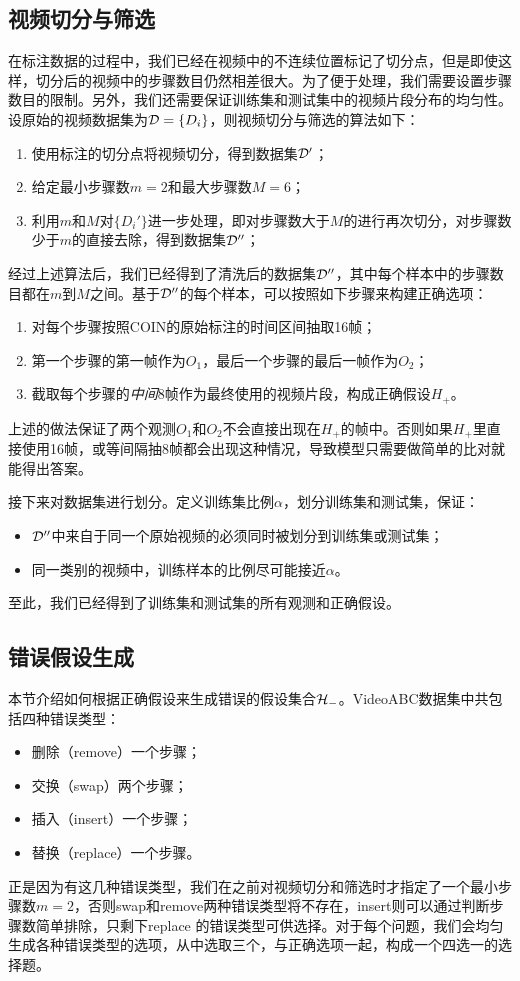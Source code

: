 \subsection{视频切分与筛选}
\label{sec:filter}
在标注数据的过程中，我们已经在视频中的不连续位置标记了切分点，但是即使这样，切分后的视频中的步骤数目仍然相差很大。为了便于处理，我们需要设置步骤数目的限制。另外，我们还需要保证训练集和测试集中的视频片段分布的均匀性。设原始的视频数据集为${\mathcal{D}}=\{D_i\}$，则视频切分与筛选的算法如下：
\begin{enumerate}
    \item 使用标注的切分点将视频切分，得到数据集${\mathcal{D}}'$；
    \item 给定最小步骤数$m=2$和最大步骤数$M=6$；
    \item 利用$m$和$M$对$\{D_i'\}$进一步处理，即对步骤数大于$M$的进行再次切分，对步骤数少于$m$的直接去除，得到数据集${\mathcal{D}}''$；

\end{enumerate}
经过上述算法后，我们已经得到了清洗后的数据集${\mathcal{D}}''$，其中每个样本中的步骤数目都在$m$到$M$之间。基于${\mathcal{D}}''$的每个样本，可以按照如下步骤来构建正确选项：
\begin{enumerate}
    \item 对每个步骤按照COIN的原始标注的时间区间抽取16帧；
    \item 第一个步骤的第一帧作为$O_1$，最后一个步骤的最后一帧作为$O_2$；
    \item 截取每个步骤的\emph{中间}8帧作为最终使用的视频片段，构成正确假设$H_+$。
\end{enumerate}

上述的做法保证了两个观测$O_1$和$O_2$不会直接出现在$H_+$的帧中。否则如果$H_+$里直接使用16帧，或等间隔抽8帧都会出现这种情况，导致模型只需要做简单的比对就能得出答案。

接下来对数据集进行划分。定义训练集比例$\alpha$，划分训练集和测试集，保证：
\begin{itemize}
    \item ${\mathcal{D}}''$中来自于同一个原始视频的必须同时被划分到训练集或测试集；
    \item 同一类别的视频中，训练样本的比例尽可能接近$\alpha$。
\end{itemize}
至此，我们已经得到了训练集和测试集的所有观测和正确假设。
\subsection{错误假设生成}
本节介绍如何根据正确假设来生成错误的假设集合${\mathcal{H}}_-$。VideoABC数据集中共包括四种错误类型：
\begin{itemize}
    \item 删除（remove）一个步骤；
    \item 交换（swap）两个步骤；
    \item 插入（insert）一个步骤；
    \item 替换（replace）一个步骤。
\end{itemize}
正是因为有这几种错误类型，我们在之前对视频切分和筛选时才指定了一个最小步骤数$m=2$，否则swap和remove两种错误类型将不存在，insert则可以通过判断步骤数简单排除，只剩下replace 的错误类型可供选择。对于每个问题，我们会均匀生成各种错误类型的选项，从中选取三个，与正确选项一起，构成一个四选一的选择题。
